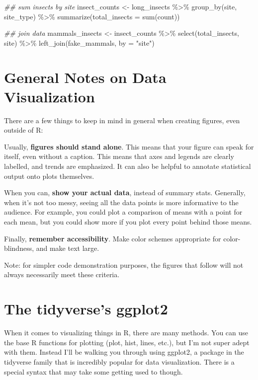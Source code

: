 \documentclass[
  letterpaper,
  DIV=11,
  numbers=noendperiod]{scrreprt}
\newenvironment{Shaded}{\begin{snugshade}}{\end{snugshade}}
\newcommand{\AttributeTok}[1]{\textcolor[rgb]{0.40,0.45,0.13}{#1}}
\newcommand{\DocumentationTok}[1]{\textcolor[rgb]{0.37,0.37,0.37}{\textit{#1}}}
\newcommand{\FunctionTok}[1]{\textcolor[rgb]{0.28,0.35,0.67}{#1}}
\newcommand{\NormalTok}[1]{\textcolor[rgb]{0.00,0.23,0.31}{#1}}
\newcommand{\OtherTok}[1]{\textcolor[rgb]{0.00,0.23,0.31}{#1}}
\newcommand{\SpecialCharTok}[1]{\textcolor[rgb]{0.37,0.37,0.37}{#1}}
\newcommand{\StringTok}[1]{\textcolor[rgb]{0.13,0.47,0.30}{#1}}
\begin{document}
\begin{Shaded}
\begin{Highlighting}[]
\DocumentationTok{\#\# sum insects by site}
\NormalTok{insect\_counts }\OtherTok{\textless{}{-}}\NormalTok{ long\_insects }\SpecialCharTok{\%\textgreater{}\%}
  \FunctionTok{group\_by}\NormalTok{(site, site\_type) }\SpecialCharTok{\%\textgreater{}\%}
  \FunctionTok{summarize}\NormalTok{(}\AttributeTok{total\_insects =} \FunctionTok{sum}\NormalTok{(count))}

\DocumentationTok{\#\# join data}
\NormalTok{mammals\_insects }\OtherTok{\textless{}{-}}\NormalTok{ insect\_counts }\SpecialCharTok{\%\textgreater{}\%}
  \FunctionTok{select}\NormalTok{(total\_insects, site) }\SpecialCharTok{\%\textgreater{}\%}
  \FunctionTok{left\_join}\NormalTok{(fake\_mammals, }\AttributeTok{by =} \StringTok{"site"}\NormalTok{)}
\end{Highlighting}
\end{Shaded}

\section{General Notes on Data
Visualization}\label{general-notes-on-data-visualization}

There are a few things to keep in mind in general when creating figures,
even outside of R:

Usually, \textbf{figures should stand alone}. This means that your
figure can speak for itself, even without a caption. This means that
axes and legends are clearly labelled, and trends are emphasized. It can
also be helpful to annotate statistical output onto plots themselves.

When you can, \textbf{show your actual data}, instead of summary stats.
Generally, when it's not too messy, seeing all the data points is more
informative to the audience. For example, you could plot a comparison of
means with a point for each mean, but you could show more if you plot
every point behind those means.

Finally, \textbf{remember accessibility}. Make color schemes appropriate
for color-blindness, and make text large.

Note: for simpler code demonstration purposes, the figures that follow
will not always necessarily meet these criteria.

\section{The tidyverse's ggplot2}\label{the-tidyverses-ggplot2}

When it comes to visualizing things in R, there are many methods. You
can use the base R functions for plotting (plot, hist, lines, etc.), but
I'm not super adept with them. Instead I'll be walking you through using
ggplot2, a package in the tidyverse family that is incredibly popular
for data visualization. There is a special syntax that may take some
getting used to though.
\end{document}
